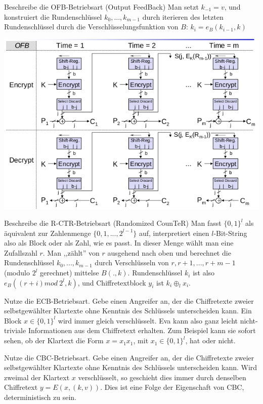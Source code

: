 \documentclass[avery5371, frame]{flashcards}
\begin{document}
\begin{flashcard}[Betriebsarten]{Beschreibe die OFB-Betriebsart (Output FeedBack)}
    Man setzt $k_{-1}=v$, und konstruiert die Rundenschlüssel $k_0,...,k_{m-1}$ durch iterieren des letzten Rundenschlüssel durch die Verschlüsselungsfunktion von $B$: $k_i=e_B(k_{i-1}, k)$%

    \includegraphics[width=.5\linewidth]{Assets/NetworkSecurity-output-feedback-mode.png}
\end{flashcard}

\begin{flashcard}[Betriebsarten]{Beschreibe die R-CTR-Betriebsart (Randomized CounTeR)}
    Man fasst $\{0,1\}^l$ als äquivalent zur Zahlenmenge $\{0,1,...,2^{l-1}\}$ auf, interpretiert einen $l$-Bit-String also als Block oder als Zahl, wie es passt. In dieser Menge wählt man eine Zufallszahl $r$. Man ,,zählt'' von $r$ ausgehend nach oben und berechnet die Rundenschlüssel $k_0,...,k_{m-1}$ durch Verschlüsseln von $r,r+1,...,r+m-1$ (modulo $2^l$ gerechnet) mittelse $B(.,k)$. Rundenschlüssel $k_i$ ist also $e_B((r+i) mod\ 2^l,k)$, und Chiffretextblock $y_i$ ist $k_i\oplus_l x_i$.
\end{flashcard}

\begin{flashcard}[Betriebsarten]{Nutze die ECB-Betriebsart. Gebe einen Angreifer an, der die Chiffretexte zweier selbstgewählter Klartexte ohne Kenntnis des Schlüssels unterscheiden kann.}
    Ein Block $x\in\{0,1\}^l$ wird immer gleich verschlüsselt. Eva kann also ganz leicht nicht-triviale Informationen aus dem Chiffretext erhalten.
    Zum Beispiel kann sie sofort sehen, ob der Klartext die Form $x=x_1 x_1$, mit $x_1\in\{0,1\}^l$, hat oder nicht.
\end{flashcard}

\begin{flashcard}[Betriebsarten]{Nutze die CBC-Betriebsart. Gebe einen Angreifer an, der die Chiffretexte zweier selbstgewählter Klartexte ohne Kenntnis des Schlüssels unterscheiden kann.}
    Wird zweimal der Klartext $x$ verschlüsselt, so geschieht dies immer durch denselben Chiffretext $y=E(x,(k,v))$. Dies ist eine Folge der Eigenschaft von CBC, deterministisch zu sein.
\end{flashcard}
\end{document}
